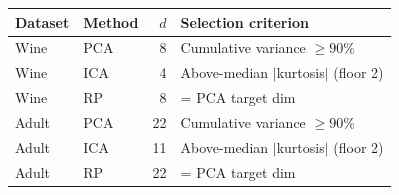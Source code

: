 \begin{tabular}{llrl}
\toprule
Dataset & Method & $d$ & Selection criterion \\
\midrule
Wine & PCA & 8 & Cumulative variance $\geq 90\%$ \\
Wine & ICA & 4 & Above-median $|$kurtosis$|$ (floor 2) \\
Wine & RP & 8 & = PCA target dim \\
Adult & PCA & 22 & Cumulative variance $\geq 90\%$ \\
Adult & ICA & 11 & Above-median $|$kurtosis$|$ (floor 2) \\
Adult & RP & 22 & = PCA target dim \\
\bottomrule
\end{tabular}
